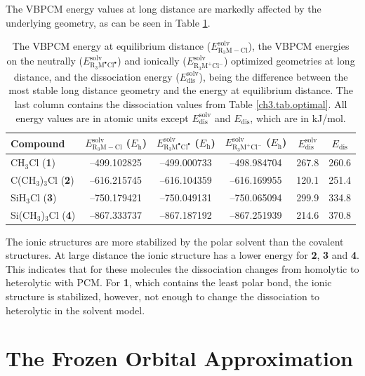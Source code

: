 The VBPCM energy values at long distance are markedly affected by the underlying geometry, as can be seen in Table \ref{ch3.tab.solution}.
\begin{table}[htp]
\center
\caption{The VBPCM energy at equilibrium distance ($E_\mathrm{R_{3}M-Cl}^\mathrm{solv}$), the VBPCM energies on the neutrally ($E_\mathrm{R_{3}M^\bullet Cl^\bullet}^\mathrm{solv}$) and ionically ($E_\mathrm{R_{3}M^{+} Cl^{-}}^\mathrm{solv}$) optimized geometries at long distance, and the dissociation energy ($E_\mathrm{dis}^\mathrm{solv}$), being the difference between the most stable long distance geometry and the energy at equilibrium distance. The last column contains the dissociation values from Table \ref{ch3.tab.optimal}. All energy values are in atomic units except $E_\mathrm{dis}^\mathrm{solv}$ and $E_\mathrm{dis}$, which are in kJ/mol.}
\begin{tabular}{ l c c c c c}
\hline
\textbf{Compound} & $E_\mathrm{R_{3}M-Cl}^\mathrm{solv}$ ($E_{\mathrm{h}}$) & $E_\mathrm{R_{3}M^\bullet Cl^\bullet}^\mathrm{solv}$ ($E_{\mathrm{h}}$) & $E_\mathrm{R_{3}M^{+} Cl^{-}}^\mathrm{solv}$ ($E_{\mathrm{h}}$) & $E_\mathrm{dis}^\mathrm{solv}$&
$E_\mathrm{dis}$\\
\hline
CH$_3$Cl (\textbf{1})& --499.102825 & --499.000733 & --498.984704 & 267.8 & 260.6 \\
C(CH$_3$)$_3$Cl (\textbf{2})& --616.215745 & --616.104359 & --616.169955& 120.1 & 251.4 \\
SiH$_3$Cl (\textbf{3})& --750.179421& --750.049131 & --750.065094 &  299.9 & 334.8 \\
Si(CH$_3$)$_3$Cl (\textbf{4})& --867.333737 & --867.187192 &--867.251939& 214.6 & 370.8 \\
\end{tabular}
\label{ch3.tab.solution}
\end{table} 

The ionic structures are more stabilized by the polar solvent than the covalent structures. At large distance the ionic structure has a lower energy for \textbf{2}, \textbf{3} and \textbf{4}. This indicates that for these molecules the dissociation changes from homolytic to heterolytic with PCM. For \textbf{1}, which contains the least polar bond, the ionic structure is stabilized, however, not enough to change the dissociation to heterolytic in the solvent model.

\section{The Frozen Orbital Approximation}

